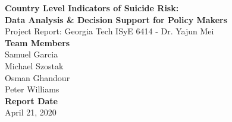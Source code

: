 \documentclass[]{article}
\author{}
\date{\vspace{-2.5em}}
\begin{document}
\begin{flushleft}
\LARGE{\textbf{Country Level Indicators of Suicide Risk:\\ Data Analysis \& Decision Support for Policy Makers}}\\
\vspace*{2\baselineskip}
\Large{Project Report: Georgia Tech ISyE 6414 - Dr. Yajun Mei}\\
\vspace*{3\baselineskip}
\Large{\textbf{Team Members}}\\
Samuel Garcia\\
Michael Szostak\\ 
Osman Ghandour\\ 
Peter Williams\\
\vspace*{2\baselineskip}
\Large{\textbf{Report Date}}\\
April 21, 2020
\newpage
\end{flushleft}

{
\setcounter{tocdepth}{2}
\tableofcontents
}
\newpage
\end{document}

